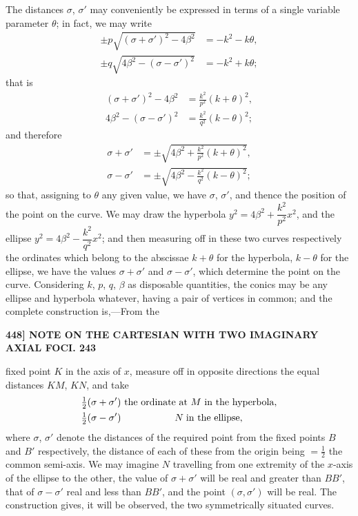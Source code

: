 \documentclass[11pt]{article}
\begin{document}
The distances $\sigma$, $\sigma'$ may conveniently be expressed in terms of a single variable
parameter $\theta$; in fact, we may write
\begin{align*}
\pm p\sqrt{(\sigma + \sigma')^2 - 4\beta^2} &= -k^2 - k\theta,\\
\pm q\sqrt{4\beta^2 - (\sigma - \sigma')^2} &= -k^2 + k\theta;
\end{align*}
that is
\begin{align*}
(\sigma + \sigma')^2 - 4\beta^2 &= \frac{k^2}{p^2}(k + \theta)^2,\\
4\beta^2 - (\sigma - \sigma')^2 &= \frac{k^2}{q^2}(k - \theta)^2;
\end{align*}
and therefore
\begin{align*}
\sigma + \sigma' &= \pm \sqrt{4\beta^2 + \frac{k^2}{p^2}(k + \theta)^2},\\
\sigma - \sigma' &= \pm \sqrt{4\beta^2 - \frac{k^2}{q^2}(k - \theta)^2};
\end{align*}
so that, assigning to $\theta$ any given value, we have $\sigma$, $\sigma'$, and thence the position of
the point on the curve. We may draw the hyperbola $y^2 = 4\beta^2 + \dfrac{k^2}{p^2}x^2$, and the ellipse
$y^2 = 4\beta^2 - \dfrac{k^2}{q^2}x^2$; and then measuring off in these two curves respectively the ordinates
which belong to the abscissae $k + \theta$ for the hyperbola, $k - \theta$ for the ellipse, we have
the values $\sigma + \sigma'$ and $\sigma - \sigma'$, which determine the point on the curve. Considering
$k$, $p$, $q$, $\beta$ as disposable quantities, the conics may be any ellipse and hyperbola whatever,
having a pair of vertices in common; and the complete construction is,---From the

\medskip
\noindent\textbf{448] \quad NOTE ON THE CARTESIAN WITH TWO IMAGINARY AXIAL FOCI. \hfill 243}

\medskip

fixed point $K$ in the axis of $x$, measure off in opposite directions the equal distances
$KM$, $KN$, and take
\begin{align*}
\tfrac{1}{2}(\sigma + \sigma') &\text{ the ordinate at } M \text{ in the hyperbola},\\
\tfrac{1}{2}(\sigma - \sigma') &\text{\quad\quad\quad\quad\quad}\;\; N \;\text{in the ellipse},
\end{align*}
where $\sigma$, $\sigma'$ denote the distances of the required point from the fixed points $B$ and $B'$
respectively, the distance of each of these from the origin being $= \tfrac{1}{2}$ the common
semi-axis. We may imagine $N$ travelling from one extremity of the $x$-axis of the
ellipse to the other, the value of $\sigma + \sigma'$ will be real and greater than $BB'$, that of
$\sigma - \sigma'$ real and less than $BB'$, and the point $(\sigma, \sigma')$ will be real. The construction
gives, it will be observed, the two symmetrically situated curves.
\end{document}
